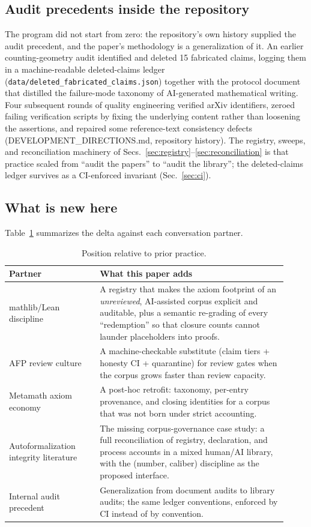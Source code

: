 \subsection{Audit precedents inside the repository}
\label{sec:related-audit}
The program did not start from zero: the repository's own history
supplied the audit precedent, and the paper's methodology is a
generalization of it. An earlier counting-geometry audit identified
and deleted 15 fabricated claims, logging them in a machine-readable
deleted-claims ledger
(\texttt{data/deleted\_fabricated\_claims.json}) together with the
protocol document that distilled the failure-mode taxonomy of
AI-generated mathematical writing. Four subsequent rounds of quality
engineering verified  arXiv identifiers, zeroed
 failing verification scripts by fixing the underlying
content rather than loosening the assertions, and repaired some
 reference-text consistency defects
(DEVELOPMENT\_DIRECTIONS.md, repository history). The registry,
sweeps, and reconciliation machinery of
Secs.~\ref{sec:registry}--\ref{sec:reconciliation} is that practice
scaled from ``audit the papers'' to ``audit the library''; the
deleted-claims ledger survives as a CI-enforced invariant
(Sec.~\ref{sec:ci}).

\subsection{What is new here}
\label{sec:related-delta}
Table~\ref{tab:delta} summarizes the delta against each
conversation partner.

\begin{table}[t]
\caption{Position relative to prior practice.}
\label{tab:delta}
\begin{center}
\small
\begin{tabular}{@{}p{0.30\linewidth}p{0.62\linewidth}@{}}
\toprule
Partner & What this paper adds \\
\midrule
mathlib/Lean discipline & A registry that makes the axiom footprint
of an \emph{unreviewed}, AI-assisted corpus explicit and auditable,
plus a semantic re-grading of every ``redemption'' so that closure
counts cannot launder placeholders into proofs. \\
AFP review culture & A machine-checkable substitute
(claim tiers + honesty CI + quarantine) for review gates when the
corpus grows faster than review capacity. \\
Metamath axiom economy & A post-hoc retrofit: taxonomy,
per-entry provenance, and closing identities for a corpus that was
not born under strict accounting. \\
Autoformalization integrity literature & The missing corpus-governance
case study: a full reconciliation of registry, declaration, and
process accounts in a mixed human/AI library, with the (number,
caliber) discipline as the proposed interface. \\
Internal audit precedent & Generalization from document audits to
library audits; the same ledger conventions, enforced by CI instead
of by convention. \\
\bottomrule
\end{tabular}
\end{center}
\end{table}
